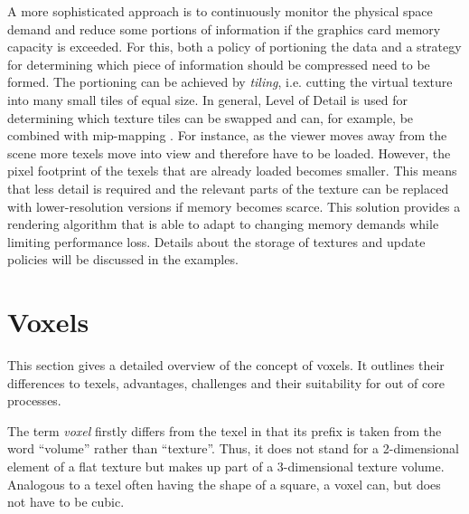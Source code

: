 A more sophisticated approach is to continuously monitor the physical space demand and reduce some portions of information if the graphics card memory capacity is exceeded. For this, both a policy of portioning the data and a strategy for determining which piece of information should be compressed need to be formed. The portioning can be achieved by \textit{tiling}, i.e. cutting the virtual texture into many small tiles of equal size. In general, Level of Detail is used for determining which texture tiles can be swapped and can, for example, be combined with mip-mapping \cite{Crassin:2009:GRS:1507149.1507152}. For instance, as the viewer moves away from the scene more texels move into view and therefore have to be loaded. However, the pixel footprint of the texels that are already loaded becomes smaller. This means that less detail is required and the relevant parts of the texture can be replaced with lower-resolution versions if memory becomes scarce. This solution provides a rendering algorithm that is able to adapt to changing memory demands while limiting performance loss. Details about the storage of textures and update policies will be discussed in the examples.

\section{Voxels}

This section gives a detailed overview of the concept of voxels. It outlines their differences to texels, advantages, challenges and their suitability for out of core processes.

The term \textit{voxel} firstly differs from the texel in that its prefix is taken from the word ``volume'' rather than ``texture''. Thus, it does not stand for a 2-dimensional element of a flat texture but makes up part of a 3-dimensional texture volume. Analogous to a texel often having the shape of a square, a voxel can, but does not have to be cubic.

